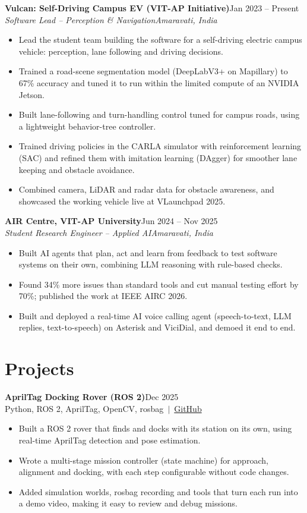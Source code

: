 \documentclass[a4paper,10pt]{article}
\newcommand{\job}[4]{\textbf{#1}\hfill #2\\\textit{#3}\hfill\textit{#4}\par\vspace{-2pt}}
\newcommand{\project}[3]{\textbf{#1}\hfill #2\\{\small #3}\par\vspace{-2pt}}
\newcommand{\gap}{\vspace{5pt}}
\begin{document}
\job{Vulcan: Self-Driving Campus EV (VIT-AP Initiative)}{Jan 2023 -- Present}{Software Lead -- Perception \& Navigation}{Amaravati, India}
\begin{itemize}
  \item Lead the student team building the software for a self-driving electric campus vehicle: perception, lane following and driving decisions.
  \item Trained a road-scene segmentation model (DeepLabV3+ on Mapillary) to 67\% accuracy and tuned it to run within the limited compute of an NVIDIA Jetson.
  \item Built lane-following and turn-handling control tuned for campus roads, using a lightweight behavior-tree controller.
  \item Trained driving policies in the CARLA simulator with reinforcement learning (SAC) and refined them with imitation learning (DAgger) for smoother lane keeping and obstacle avoidance.
  \item Combined camera, LiDAR and radar data for obstacle awareness, and showcased the working vehicle live at VLaunchpad 2025.
\end{itemize}
\gap

\job{AIR Centre, VIT-AP University}{Jun 2024 -- Nov 2025}{Student Research Engineer -- Applied AI}{Amaravati, India}
\begin{itemize}
  \item Built AI agents that plan, act and learn from feedback to test software systems on their own, combining LLM reasoning with rule-based checks.
  \item Found 34\% more issues than standard tools and cut manual testing effort by 70\%; published the work at IEEE AIRC 2026.
  \item Built and deployed a real-time AI voice calling agent (speech-to-text, LLM replies, text-to-speech) on Asterisk and ViciDial, and demoed it end to end.
\end{itemize}

\section{Projects}

\project{AprilTag Docking Rover (ROS 2)}{Dec 2025}{Python, ROS 2, AprilTag, OpenCV, rosbag \,$|$\, \href{https://github.com/nithin434/apriltag_rover}{GitHub}}
\begin{itemize}
  \item Built a ROS 2 rover that finds and docks with its station on its own, using real-time AprilTag detection and pose estimation.
  \item Wrote a multi-stage mission controller (state machine) for approach, alignment and docking, with each step configurable without code changes.
  \item Added simulation worlds, rosbag recording and tools that turn each run into a demo video, making it easy to review and debug missions.
\end{itemize}
\gap
\end{document}
